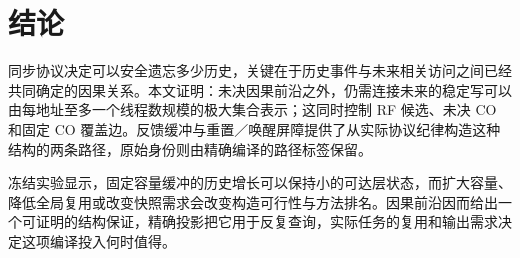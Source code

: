 \section{结论}
同步协议决定可以安全遗忘多少历史，关键在于历史事件与未来相关访问之间已经共同确定的因果关系。本文证明：未决因果前沿之外，仍需连接未来的稳定写可以由每地址至多一个线程数规模的极大集合表示；这同时控制 RF 候选、未决 CO 和固定 CO 覆盖边。反馈缓冲与重置／唤醒屏障提供了从实际协议纪律构造这种结构的两条路径，原始身份则由精确编译的路径标签保留。

冻结实验显示，固定容量缓冲的历史增长可以保持小的可达层状态，而扩大容量、降低全局复用或改变快照需求会改变构造可行性与方法排名。因果前沿因而给出一个可证明的结构保证，精确投影把它用于反复查询，实际任务的复用和输出需求决定这项编译投入何时值得。
